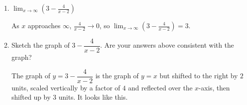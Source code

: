 \documentclass{article}
\begin{document}
\begin{enumerate}
\begin{enumerate}
    \item
      \begin{problem}
        $\displaystyle \lim_{x \to \infty} \left( 3 - \frac{4}{x - 2} \right)$
      \end{problem}

      \begin{solution}
        As $x$ approaches $\infty$, $\frac{4}{x-2} \to 0$, so 
        $\displaystyle \lim_{x \to \infty} \left( 3 - \frac{4}{x - 2} \right) =3$.
      \end{solution}

    \probonly{\end{enumeratecols}}

    \pspace{1.5in}

  \item
    \begin{problem}[\vfill]
      Sketch the graph of $3 - \dfrac{4}{x - 2}$.  Are your answers above
      consistent with the graph? 
    \end{problem}

    \begin{solution}
      The graph of $y = 3 - \dfrac{4}{x - 2}$ is the graph of $y=x$ but shifted to the right by $2$ units,
      scaled vertically by a factor of $4$ and reflected over the $x$-axis, then shifted up by $3$ units.
      It looks like this.

    \end{solution}

  \end{enumerate}

\end{enumerate}
\end{document}
